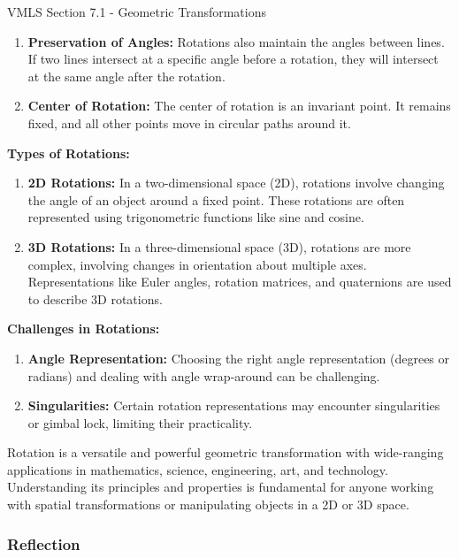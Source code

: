 \begin{notes}{VMLS Section 7.1 - Geometric Transformations}
\begin{enumerate}
        \item \textbf{Preservation of Angles:} Rotations also maintain the angles between lines. If two lines intersect at a specific angle before a rotation, they will intersect at the same angle after 
        the rotation.
        
        \item \textbf{Center of Rotation:} The center of rotation is an invariant point. It remains fixed, and all other points move in circular paths around it.
    \end{enumerate}

    \textbf{Types of Rotations:}

    \begin{enumerate}
        \item \textbf{2D Rotations:} In a two-dimensional space (2D), rotations involve changing the angle of an object around a fixed point. These rotations are often represented using trigonometric 
        functions like sine and cosine.
        
        \item \textbf{3D Rotations:} In a three-dimensional space (3D), rotations are more complex, involving changes in orientation about multiple axes. Representations like Euler angles, rotation 
        matrices, and quaternions are used to describe 3D rotations.
    \end{enumerate}

    \textbf{Challenges in Rotations:}

    \begin{enumerate}
        \item \textbf{Angle Representation:} Choosing the right angle representation (degrees or radians) and dealing with angle wrap-around can be challenging.
        
        \item \textbf{Singularities:} Certain rotation representations may encounter singularities or gimbal lock, limiting their practicality.
    \end{enumerate}

    Rotation is a versatile and powerful geometric transformation with wide-ranging applications in mathematics, science, engineering, art, and technology. Understanding its principles and properties 
    is fundamental for anyone working with spatial transformations or manipulating objects in a 2D or 3D space.

    \subsubsection*{Reflection}


\end{notes}
